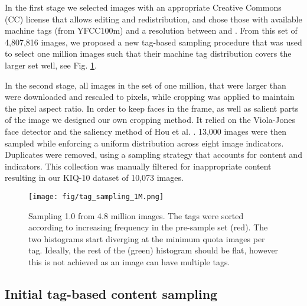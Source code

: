 \documentclass{article}
\begin{document}
In the first stage we selected images with an appropriate Creative Commons (CC) license that allows editing and redistribution, and chose those with  available machine tags (from YFCC100m) and a resolution between  and . From this set of 4,807,816 images, we proposed a new tag-based sampling procedure that was used to select one million images such that their machine tag distribution covers  the larger set well, see Fig. \ref{fig:tag_sampling}.



In the second stage, all images in the set of one million, that were larger than   were downloaded and rescaled to  pixels, while cropping was applied to maintain the pixel aspect ratio. In order to keep faces in the frame, as well as salient parts of the image we designed our own cropping method. It relied on the Viola-Jones face detector and the saliency method of Hou et al. \cite{hou_image_2012}. 13,000 images were then sampled while enforcing a uniform distribution across eight image indicators. Duplicates were removed, using a sampling strategy that accounts for content and indicators. This collection was manually filtered for inappropriate content resulting in our KIQ-10 dataset of 10,073 images.


\begin{figure}[!t]
\centering
\vspace{-10pt}
\texttt{[image: fig/tag\_sampling\_1M.png]}
\vspace{-5pt}
\caption{Sampling 1.0 from 4.8 million images. The tags were sorted according to increasing frequency in the pre-sample set (red). The two histograms start diverging at the minimum quota  images per tag. Ideally, the rest of the (green) histogram should be flat, however this is not achieved as an image can have multiple tags.\vspace{-20pt}}
\label{fig:tag_sampling}
\end{figure}

\subsection{Initial tag-based content sampling}
\end{document}
